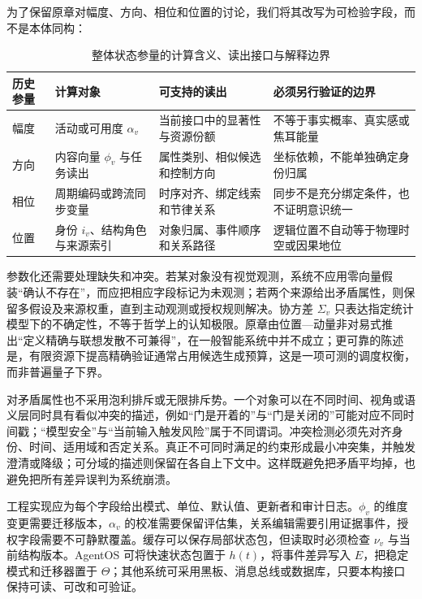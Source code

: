 为了保留原章对幅度、方向、相位和位置的讨论，我们将其改写为可检验字段，而不是本体同构：
\begin{table}[htbp]
\centering
\footnotesize
\renewcommand{\arraystretch}{1.35}
\begin{tabularx}{\textwidth}{l X X X}
\toprule
\rowcolor{structurecolor!20} 历史参量 & 计算对象 & 可支持的读出 & 必须另行验证的边界 \\
\midrule
幅度 & 活动或可用度 $\alpha_v$ & 当前接口中的显著性与资源份额 & 不等于事实概率、真实感或焦耳能量 \\
\hline
方向 & 内容向量 $\phi_v$ 与任务读出 & 属性类别、相似候选和控制方向 & 坐标依赖，不能单独确定身份归属 \\
\hline
相位 & 周期编码或跨流同步变量 & 时序对齐、绑定线索和节律关系 & 同步不是充分绑定条件，也不证明意识统一 \\
\hline
位置 & 身份 $i_v$、结构角色与来源索引 & 对象归属、事件顺序和关系路径 & 逻辑位置不自动等于物理时空或因果地位 \\
\bottomrule
\end{tabularx}
\caption{整体状态参量的计算含义、读出接口与解释边界}
\label{tab:psi_phenomenology_mapping}
\end{table}

参数化还需要处理缺失和冲突。若某对象没有视觉观测，系统不应用零向量假装“确认不存在”，而应把相应字段标记为未观测；若两个来源给出矛盾属性，则保留多假设及来源权重，直到主动观测或授权规则解决。协方差 $\Sigma_v$ 只表达指定统计模型下的不确定性，不等于哲学上的认知极限。原章由位置—动量非对易式推出“定义精确与联想发散不可兼得”，在一般智能系统中并不成立；更可靠的陈述是，有限资源下提高精确验证通常占用候选生成预算，这是一项可测的调度权衡，而非普遍量子下界。

对矛盾属性也不采用泡利排斥或无限排斥势。一个对象可以在不同时间、视角或语义层同时具有看似冲突的描述，例如“门是开着的”与“门是关闭的”可能对应不同时间戳；“模型安全”与“当前输入触发风险”属于不同谓词。冲突检测必须先对齐身份、时间、适用域和否定关系。真正不可同时满足的约束形成最小冲突集，并触发澄清或降级；可分域的描述则保留在各自上下文中。这样既避免把矛盾平均掉，也避免把所有差异误判为系统崩溃。

工程实现应为每个字段给出模式、单位、默认值、更新者和审计日志。$\phi_v$ 的维度变更需要迁移版本，$\alpha_v$ 的校准需要保留评估集，关系编辑需要引用证据事件，授权字段需要不可静默覆盖。缓存可以保存局部状态包，但读取时必须检查 $\nu_v$ 与当前结构版本。AgentOS 可将快速状态包置于 $h(t)$，将事件差异写入 $E$，把稳定模式和迁移器置于 $\Theta$；其他系统可采用黑板、消息总线或数据库，只要本构接口保持可读、可改和可验证。

